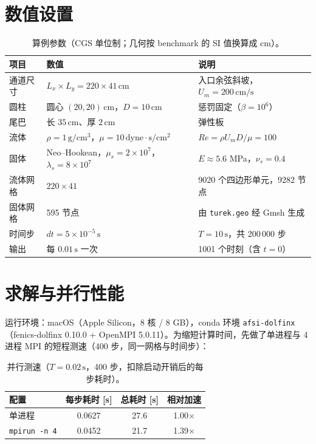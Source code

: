 \documentclass[11pt]{ctexart}
\newcommand{\cm}{\,\mathrm{cm}}
\newcommand{\dyn}{\,\mathrm{dyne}}
\begin{document}
\section{数值设置}

\begin{table}[htbp]
  \centering
  \caption{算例参数（CGS 单位制；几何按 benchmark 的 SI 值换算成 cm）。}
  \label{tab:setup}
  \begin{tabular}{lll}
    \toprule
    项目 & 数值 & 说明 \\
    \midrule
    通道尺寸 & $L_x\times L_y = 220\times41\cm$ & 入口余弦斜坡，$U_m=200\cm/\mathrm{s}$ \\
    圆柱 & 圆心 $(20,20)\cm$，$D=10\cm$ & 惩罚固定（$\beta=10^{6}$）\\
    尾巴 & 长 $35\cm$、厚 $2\cm$ & 弹性板 \\
    流体 & $\rho=1\,\mathrm{g/cm^3}$，$\mu=10\dyn\cdot\mathrm{s/cm^2}$ & $Re=\rho U_m D/\mu = 100$ \\
    固体 & Neo--Hookean，$\mu_s=2\times10^{7}$，$\lambda_s=8\times10^{7}$ & $E\approx5.6$ MPa，$\nu_s=0.4$ \\
    流体网格 & $220\times41$ & 9020 个四边形单元，9282 节点 \\
    固体网格 & 595 节点 & 由 \texttt{turek.geo} 经 Gmsh 生成 \\
    时间步 & $dt = 5\times10^{-5}\,\mathrm{s}$ & $T=10\,\mathrm{s}$，共 200\,000 步 \\
    输出 & 每 $0.01\,\mathrm{s}$ 一次 & 1001 个时刻（含 $t=0$）\\
    \bottomrule
  \end{tabular}
\end{table}

\section{求解与并行性能}

运行环境：macOS（Apple Silicon，8 核 / 8 GB），conda 环境 \texttt{afsi-dolfinx}
（fenics-dolfinx 0.10.0 + OpenMPI 5.0.11）。为缩短计算时间，先做了单进程与 4 进程 MPI
的短程测速（400 步，同一网格与时间步）：

\begin{table}[htbp]
  \centering
  \caption{并行测速（$T=0.02\,\mathrm{s}$，400 步，扣除启动开销后的每步耗时）。}
  \label{tab:perf}
  \begin{tabular}{lccc}
    \toprule
    配置 & 每步耗时 [s] & 总耗时 [s] & 相对加速 \\
    \midrule
    单进程 & 0.0627 & 27.6 & 1.00$\times$ \\
    \texttt{mpirun -n 4} & 0.0452 & 21.7 & 1.39$\times$ \\
    \bottomrule
  \end{tabular}
\end{table}
\end{document}
